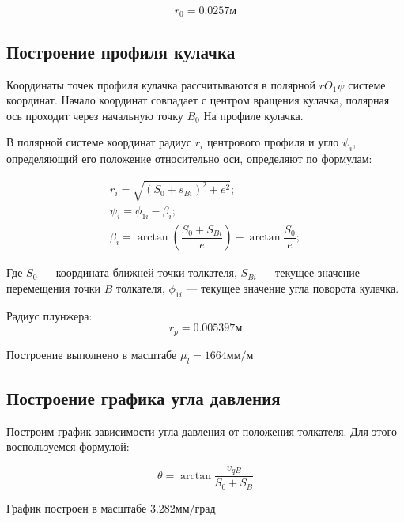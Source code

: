 $$r_0 = 0.0257 м $$

\subsection{Построение профиля кулачка}

Координаты точек профиля кулачка рассчитываются в полярной $rO_1 \psi$ системе координат. Начало координат совпадает с центром вращения кулачка, полярная ось проходит через начальную точку $B_0$ На профиле кулачка.

В полярной системе координат радиус $r_i$ центрового профиля и угло $\psi_i$, определяющий его положение относительно оси, определяют по формулам:

\begin{eqnarray}
	r_i = \sqrt{(S_0 + s_{Bi})^2 + e^2}; \\
	\psi_i = \phi_{1i} - \beta_i; \\
	\beta_i = \arctan{\left( \dfrac{S_0 + S_{Bi}}{e}\right) } - \arctan{\dfrac{S_0}{e}};
\end{eqnarray}

Где $S_0$ --- координата ближней точки толкателя, $S_{Bi}$ --- текущее значение перемещения точки $B$ толкателя, $\phi_{1i}$ --- текущее значение угла поворота кулачка.

Радиус плунжера: $$ r_p = 0.005397 м $$

Построение выполнено в масштабе $\mu_l = 1664 мм/м$

\subsection{Построение графика угла давления}

Построим график зависимости угла давления от положения толкателя. Для этого воспользуемся формулой:

\begin{equation}
	\theta = \arctan{\dfrac{v_{qB}}{S_0 + S_B}}
\end{equation}

График построен в масштабе $3.282 мм/град$